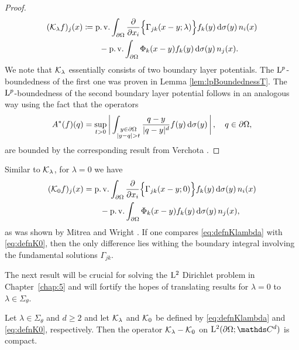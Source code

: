 \begin{proof}
\begin{align}
\begin{alignedat}{1}
    (\mathcal{K}_\lambda f)_j (x)
      &\coloneqq \operatorname{p. v.} \int_{\partial\Omega} \frac{\partial}{\partial x_i} \Big\{\Gamma_{jk}(x - y; \lambda) \Big\}  f_k(y) \, {\operatorname{d}\!{\sigma}}(y) \, n_i(x) \\
      &\qquad - \operatorname{p. v.} \int_{\partial\Omega} \Phi_k(x - y) f_k(y) \, {\operatorname{d}\!{\sigma}}(y)\, n_j(x).
    \end{alignedat}
  \end{align}
  We note that $\mathcal{K}_\lambda$ essentially consists of two boundary layer potentials. 
  The $\mathrm{L}^p$-boundedness of the first one was proven in Lemma \ref{lem:lpBoundednessT}.
  The $\mathrm{L}^p$-boundedness of the second boundary layer potential follows in an analogous way using the fact that the operators
  \begin{align*}
    A^*(f)(q) = \sup_{t > 0} \bigg| \int_{\substack{y \in \partial\Omega \\ |y - q| > t}} \frac{q - y}{|q - y|^d} f(y) \, {\operatorname{d}\!{\sigma}}(y)\, \bigg|\, , \quad q \in \partial\Omega,
  \end{align*}
  are bounded by the corresponding result from Verchota \cite[Lem. 1.2]{verchota}.
\end{proof}

Similar to $\mathcal{K}_\lambda$, for $\lambda = 0$ we have
\begin{align}
  \begin{alignedat}{1}
  \label{eq:defnK0}
    (\mathcal{K}_0 f)_j(x)&= \operatorname{p. v.} \int_{\partial\Omega} \frac{\partial}{\partial x_i} \Big\{ \Gamma_{jk}(x - y; 0) \Big\}  f_k(y) \, {\operatorname{d}\!{\sigma}}(y) \,n_i(x) \\
    &\qquad - \operatorname{p. v.} \int_{\partial\Omega} \Phi_k(x - y) f_k(y) \, {\operatorname{d}\!{\sigma}}(y)\, n_j(x),
  \end{alignedat}
\end{align}
as was shown by Mitrea and Wright \cite[Prop. 4.4]{mitreaWright}.
If one compares \eqref{eq:defnKlambda} with \eqref{eq:defnK0}, then the only difference lies withing the boundary integral involving the fundamental solutions $\Gamma_{jk}$.

The next result will be crucial for solving the $\mathrm{L}^2$ Dirichlet problem in Chapter~\ref{chap:5} and will fortify the hopes of translating results for $\lambda = 0$ to $\lambda \in \Sigma_\theta$.
\begin{lem}
  \label{lem:compactness}
  Let $\lambda \in \Sigma_\theta$ and $d \geq 2$ and let $\mathcal{K}_\lambda$ and $\mathcal{K}_0$ be defined by \eqref{eq:defnKlambda} and \eqref{eq:defnK0}, respectively.
  Then the operator $\mathcal{K}_\lambda - \mathcal{K}_0$ on $\Ell^2(\partial\Omega; \C^d)$ is compact.
\end{lem}


